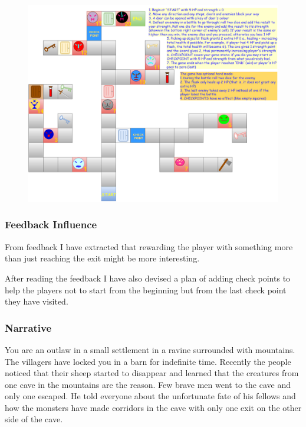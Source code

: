 \documentclass[landscape]{article}
\begin{document}
\thispagestyle{empty}

\begin{figure}[H]
  \centering
  \includegraphics[height=\textheight]{simpleGameDesign3.png}
\end{figure}

\newpage

\subsubsection*{Feedback Influence}

From feedback I have extracted that rewarding the player with something more than
just reaching the exit might be more interesting.

After reading the feedback I have also devised a plan of adding check points to
help the players not to start from the beginning but from the last check point
they have visited.

\subsubsection*{Narrative}

You are an outlaw in a small settlement in a ravine surrounded with mountains.
The villagers have locked you in a barn for indefinite time. Recently the people
noticed that their sheep started to disappear and learned that the creatures
from one cave in the mountains are the reason. Few brave men went to the cave
and only one escaped. He told everyone about the unfortunate fate of his fellows
and how the monsters have made corridors in the cave with only one exit on the
other side of the cave.
\end{document}
